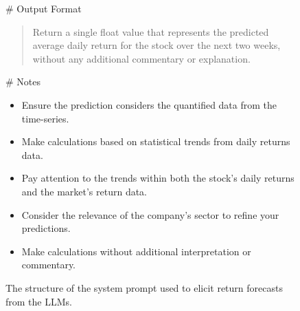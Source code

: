 \begin{figure}[htbp]
{\begin{tcolorbox}[colframe=blue!80!black, colback=blue!10!white, coltitle=white, title=System Prompt, width=1.08\columnwidth]
    \# Output Format
    \begin{quote}
    Return a single float value that represents the predicted average daily return for the stock over the next two weeks, without any additional commentary or explanation.
    \end{quote}
    
    \# Notes
    \begin{itemize}
        \item Ensure the prediction considers the quantified data from the time-series.
        \item Make calculations based on statistical trends from daily returns data.
        \item Pay attention to the trends within both the stock's daily returns and the market's return data.
        \item Consider the relevance of the company's sector to refine your predictions.
        \item Make calculations without additional interpretation or commentary.
    \end{itemize}
    
    \end{tcolorbox}%
    }
    \caption{The structure of the system prompt used to elicit return forecasts from the LLMs.}
    \label{fig:system_prompt}
\end{figure}



